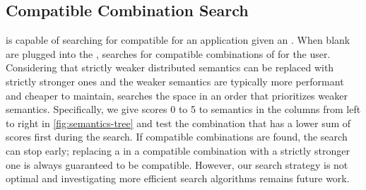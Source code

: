 \subsection{Compatible Combination Search}
\label{subsec:search}

\sysname{} is capable of searching for compatible \sysmods{} for an
application given an \sysgraph{}. When blank \sysmods{} are plugged into the
\sysgraph{}, \sysname{} searches for compatible combinations of
\sysmods{} for the user.
Considering that strictly weaker distributed semantics can be replaced
with strictly stronger ones and the weaker semantics are typically
more performant and cheaper to maintain, \sysname{} searches the space
in an order that prioritizes weaker semantics. Specifically, we give scores
0 to 5 to semantics in the columns from left to right in
\cref{fig:semantics-tree}
and test the combination that has a lower sum of scores first during the search.
If compatible combinations are found, the search can stop early; replacing a
\sysmod{} in a compatible combination with a strictly stronger one is always
guaranteed to be compatible.
However, our search strategy is not optimal and investigating more
efficient search algorithms remains future work.

